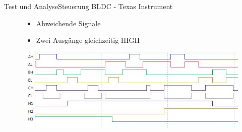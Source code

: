 \begin{frame}{Test und Analyse}{Steuerung BLDC - Texas Instrument}
	\begin{figure}
		\begin{itemize}
			\item Abweichende Signale
			\item Zwei Ausgänge gleichzeitig HIGH
		\end{itemize}
		\vspace{\baselineskip}
		\includegraphics[width=\textwidth]{Test/Steuersignale_TI}
	\end{figure}
\end{frame}
